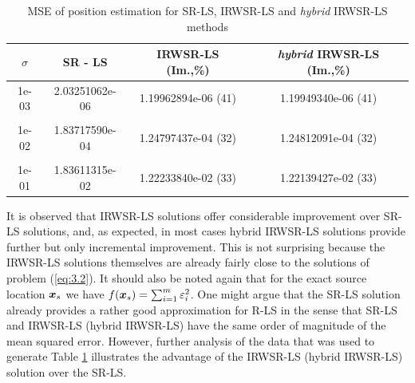 
\begin{table}[h]
\centering
\caption{MSE of position estimation for SR-LS, IRWSR-LS and \textit{hybrid} IRWSR-LS methods}
\phantom{m}
\begin{tabular}{|c|c|c|c|} \hline
\centering
$\sigma$ & SR - LS & IRWSR-LS (Im.,\%) & \textit{hybrid} IRWSR-LS (Im.,\%) \\ \hline
1e-03&	2.03251062e-06&	1.19962894e-06 (41)	& 1.19949340e-06 (41)\\ &&&\\
1e-02&	1.83717590e-04&	1.24797437e-04 (32)	& 1.24812091e-04 (32)\\ &&&\\
1e-01&	1.83611315e-02&	1.22233840e-02 (33)	& 1.22139427e-02 (33)\\ %
\hline
\end{tabular}
\label{tab:1}
\end{table}



It is observed that IRWSR-LS solutions offer considerable improvement over SR-LS solutions, and, as expected, in most cases hybrid IRWSR-LS solutions provide further but only incremental improvement. This is not surprising because the IRWSR-LS solutions themselves are already fairly close to the solutions of problem (\ref{eq:3.2}). It should also be noted again that for the exact source location $\mbox{\boldmath$x$}_s$ we have $f(\mbox{\boldmath$x$}_s) = \sum_{i=1}^m \varepsilon_i^2$. One might argue that the SR-LS solution already provides a rather good approximation for R-LS in the sense that SR-LS and IRWSR-LS (hybrid IRWSR-LS) have the same order of magnitude of the mean squared error. However, further analysis of the data that was used to generate Table \ref{tab:1} illustrates the advantage of the IRWSR-LS (hybrid IRWSR-LS) solution over the SR-LS.

